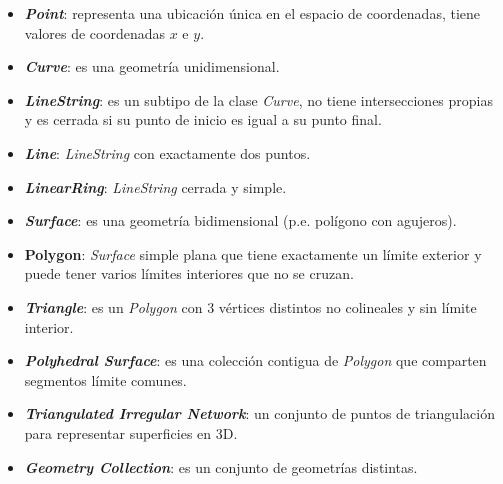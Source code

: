 \begin{itemize}
	\item \textit{\textbf{Point}}: representa una ubicación única en el espacio de coordenadas, tiene valores de coordenadas $x$ e $y$.
	
	\item \textit{\textbf{Curve}}: es una geometría unidimensional. 
	
	\item \textit{\textbf{LineString}}: es un subtipo de la clase \textit{Curve}, no tiene intersecciones propias y es cerrada si su punto de inicio es igual a su punto final.
	
	\item \textit{\textbf{Line}}: \textit{LineString} con exactamente dos puntos. 
	
	\item \textit{\textbf{LinearRing}}: \textit{LineString} cerrada y simple. 
	
	\item \textit{\textbf{Surface}}: es una geometría bidimensional (p.e. polígono con agujeros).%
	
	\item \textbf{Polygon}: \textit{Surface} simple plana que tiene exactamente un límite exterior y puede tener varios límites interiores que no se cruzan. %
	
	\item \textit{\textbf{Triangle}}: es un \textit{Polygon} con 3 vértices distintos no colineales y sin límite interior. 
	
	\item \textbf{\textit{Polyhedral Surface}}: es una colección contigua de \textit{Polygon} que comparten segmentos límite comunes. %
	
	\item \textit{\textbf{Triangulated Irregular Network}}: un conjunto de puntos de triangulación para representar superficies en 3D.
	
	\item \textit{\textbf{Geometry Collection}}:  es un conjunto de geometrías distintas. 
		

\end{itemize}

